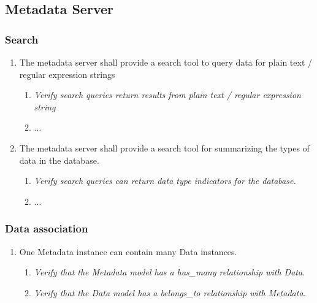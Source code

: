 \subsection{Metadata Server}
\label{sec:metadata_spec} 

\subsubsection{Search}
	\begin{enumerate}
		\item The metadata server shall provide a search tool to query data for plain text / regular expression strings

		\begin{enumerate}
			\item \textit{Verify search queries return results from plain text / regular expression string}
			\item ...
		\end{enumerate}

		\item The metadata server shall provide a search tool for summarizing the types of data in the database.
		\begin{enumerate}
			\item \textit{Verify search queries can return data type indicators for the database.}
		\item ...
		\end{enumerate}

	\end{enumerate}

\subsubsection{Data association}
	\begin{enumerate}
		\item One Metadata instance can contain many Data instances.
		\begin{enumerate}
			\item \textit{Verify that the Metadata model has a 
					has\_many relationship with Data.}
			\item \textit{Verify that the Data model has a 
					belongs\_to relationship with Metadata.}
		\end{enumerate}
	\end{enumerate}


